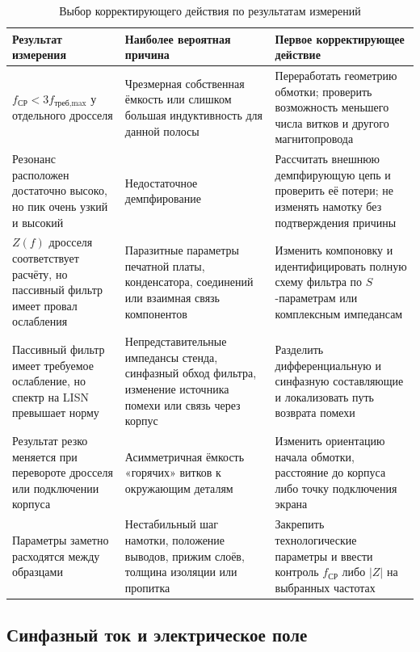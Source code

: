 \documentclass[14pt,a4paper]{extarticle}
\begin{document}
\begin{table}[htbp]
\begin{singlespace}
\caption{Выбор корректирующего действия по результатам измерений}
\label{tab:capacitance-corrective-actions}
\centering
\small
\begin{tabularx}{\textwidth}{>{\raggedright\arraybackslash}p{48mm}
>{\raggedright\arraybackslash}p{50mm}
>{\raggedright\arraybackslash}X}
\toprule
Результат измерения & Наиболее вероятная причина & Первое корректирующее
действие \\
\midrule
$f_{\text{СР}}<3f_{\text{треб,max}}$ у отдельного дросселя &
Чрезмерная собственная ёмкость или слишком большая индуктивность для данной
полосы &
Переработать геометрию обмотки; проверить возможность меньшего числа витков и
другого магнитопровода \\
Резонанс расположен достаточно высоко, но пик очень узкий и высокий &
Недостаточное демпфирование &
Рассчитать внешнюю демпфирующую цепь и проверить её потери; не изменять
намотку без подтверждения причины \\
$Z(f)$ дросселя соответствует расчёту, но пассивный фильтр имеет провал
ослабления &
Паразитные параметры печатной платы, конденсатора, соединений или взаимная
связь компонентов &
Изменить компоновку и идентифицировать полную схему фильтра по $S$-параметрам
или комплексным импедансам \\
Пассивный фильтр имеет требуемое ослабление, но спектр на LISN превышает
норму &
Непредставительные импедансы стенда, синфазный обход фильтра, изменение
источника помехи или связь через корпус &
Разделить дифференциальную и синфазную составляющие и локализовать путь
возврата помехи \\
Результат резко меняется при перевороте дросселя или подключении корпуса &
Асимметричная ёмкость «горячих» витков к окружающим деталям &
Изменить ориентацию начала обмотки, расстояние до корпуса либо точку
подключения экрана \\
Параметры заметно расходятся между образцами &
Нестабильный шаг намотки, положение выводов, прижим слоёв, толщина изоляции
или пропитка &
Закрепить технологические параметры и ввести контроль $f_{\text{СР}}$ либо
$|Z|$ на выбранных частотах \\
\bottomrule
\end{tabularx}
\end{singlespace}
\end{table}

\subsection{Синфазный ток и электрическое поле}
\end{document}
